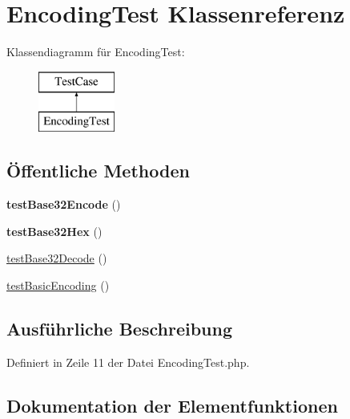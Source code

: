 \hypertarget{class_encoding_test}{}\section{Encoding\+Test Klassenreferenz}
\label{class_encoding_test}
Klassendiagramm für Encoding\+Test\+:\begin{figure}[H]
\begin{center}
\leavevmode
\includegraphics[height=2.000000cm]{class_encoding_test}
\end{center}
\end{figure}
\subsection*{Öffentliche Methoden}
\begin{DoxyCompactItemize}
\item 
\mbox{\label{class_encoding_test_a1017b77e1cb551c77546572083bed13f}} 
{\bfseries test\+Base32\+Encode} ()
\item 
\mbox{\label{class_encoding_test_ac0430143b4d6a1d2e3201b86ea17130a}} 
{\bfseries test\+Base32\+Hex} ()
\item 
\mbox{\hyperlink{class_encoding_test_a40e430b556a62250bae7c7dfffa6a291}{test\+Base32\+Decode}} ()
\item 
\mbox{\hyperlink{class_encoding_test_a05b6107e12034bc5cd886d4c4e560503}{test\+Basic\+Encoding}} ()
\end{DoxyCompactItemize}


\subsection{Ausführliche Beschreibung}


Definiert in Zeile 11 der Datei Encoding\+Test.\+php.



\subsection{Dokumentation der Elementfunktionen}
\mbox{\label{class_encoding_test_a40e430b556a62250bae7c7dfffa6a291}} 
